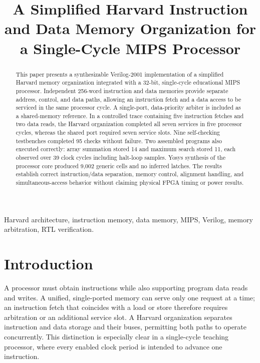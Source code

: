 \documentclass[conference]{IEEEtran}
\begin{document}
\title{A Simplified Harvard Instruction and Data Memory Organization for a Single-Cycle MIPS Processor}

\author{
}

\maketitle

\begin{abstract}
This paper presents a synthesizable Verilog-2001 implementation of a simplified Harvard memory organization integrated with a 32-bit, single-cycle educational MIPS processor. Independent 256-word instruction and data memories provide separate address, control, and data paths, allowing an instruction fetch and a data access to be serviced in the same processor cycle. A single-port, data-priority arbiter is included as a shared-memory reference. In a controlled trace containing five instruction fetches and two data reads, the Harvard organization completed all seven services in five processor cycles, whereas the shared port required seven service slots. Nine self-checking testbenches completed 95 checks without failure. Two assembled programs also executed correctly: array summation stored 14 and maximum search stored 11, each observed over 39 clock cycles including halt-loop samples. Yosys synthesis of the processor core produced 9,002 generic cells and no inferred latches. The results establish correct instruction/data separation, memory control, alignment handling, and simultaneous-access behavior without claiming physical FPGA timing or power results.
\end{abstract}

\begin{IEEEkeywords}
Harvard architecture, instruction memory, data memory, MIPS, Verilog, memory arbitration, RTL verification.
\end{IEEEkeywords}

\section{Introduction}
A processor must obtain instructions while also supporting program data reads and writes. A unified, single-ported memory can serve only one request at a time; an instruction fetch that coincides with a load or store therefore requires arbitration or an additional service slot. A Harvard organization separates instruction and data storage and their buses, permitting both paths to operate concurrently. This distinction is especially clear in a single-cycle teaching processor, where every enabled clock period is intended to advance one instruction.
\end{document}
